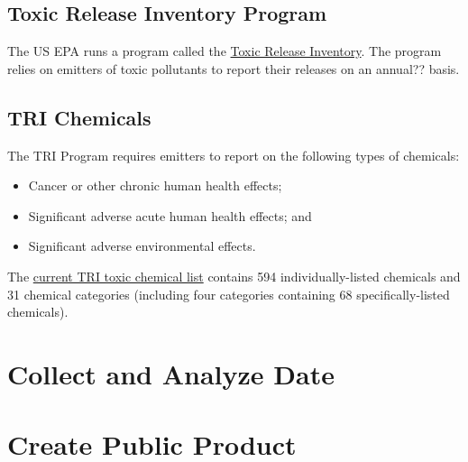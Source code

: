 \documentclass{article}
\begin{document}
\subsection{Toxic Release Inventory Program}

The US EPA runs a program called the \href{https://www.epa.gov/toxics-release-inventory-tri-program}{Toxic Release Inventory}. The program relies on emitters of toxic pollutants to report their releases on an annual?? basis. 

\subsection{TRI Chemicals}

The TRI Program requires emitters to report on the following types of chemicals:

\begin{itemize}
  \item Cancer or other chronic human health effects;
  \item Significant adverse acute human health effects; and
  \item Significant adverse environmental effects.
\end{itemize}

The \href{https://www.epa.gov/sites/production/files/2015-11/tri_chemical_list_for_ry15_11_5_2015_1.xlsx}{current TRI toxic chemical list} contains 594 individually-listed chemicals and 31 chemical categories (including four categories containing 68 specifically-listed chemicals). 



\section{Collect and Analyze Date}

\section{Create Public Product}
\end{document}
